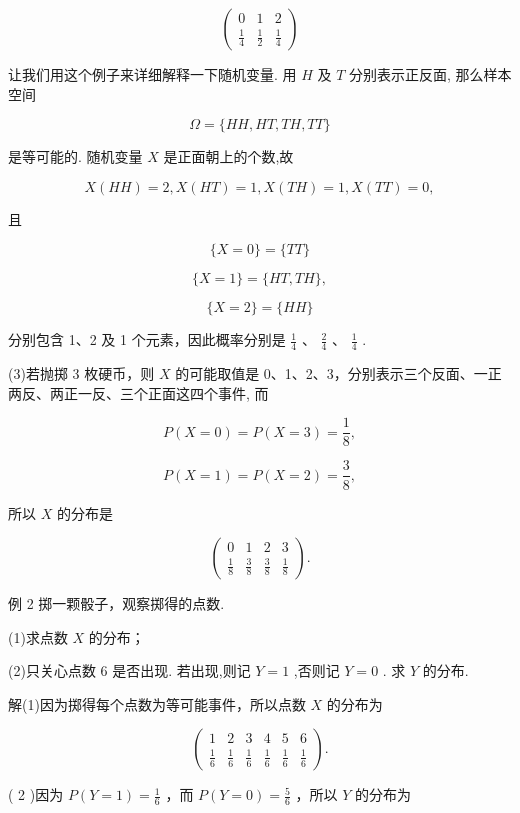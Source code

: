 \documentclass[10pt]{article}
\begin{document}
\[
\left( \begin{matrix} 0 & 1 & 2 \\  \frac{1}{4} & \frac{1}{2} & \frac{1}{4} \end{matrix}\right)
\]

让我们用这个例子来详细解释一下随机变量. 用 \(H\) 及 \(T\) 分别表示正反面, 那么样本空间

\[
\Omega  = \{ {HH},{HT},{TH},{TT}\}
\]

是等可能的. 随机变量 \(X\) 是正面朝上的个数,故

\[
X\left( {HH}\right)  = 2,X\left( {HT}\right)  = 1,X\left( {TH}\right)  = 1,X\left( {TT}\right)  = 0,
\]

且

\[
\{ X = 0\}  = \{ {TT}\}
\]

\[
\{ X = 1\}  = \{ {HT},{TH}\} ,
\]

\[
\{ X = 2\}  = \{ {HH}\}
\]

分别包含 1、2 及 1 个元素，因此概率分别是 \(\frac{1}{4}\) 、 \(\frac{2}{4}\) 、 \(\frac{1}{4}\) .

(3)若抛掷 3 枚硬币，则 \(X\) 的可能取值是 0、1、2、3，分别表示三个反面、一正两反、两正一反、三个正面这四个事件, 而

\[
P\left( {X = 0}\right)  = P\left( {X = 3}\right)  = \frac{1}{8},
\]

\[
P\left( {X = 1}\right)  = P\left( {X = 2}\right)  = \frac{3}{8},
\]

所以 \(X\) 的分布是

\[
\left( \begin{array}{llll} 0 & 1 & 2 & 3 \\  \frac{1}{8} & \frac{3}{8} & \frac{3}{8} & \frac{1}{8} \end{array}\right) .
\]

例 2 掷一颗骰子，观察掷得的点数.

(1)求点数 \(X\) 的分布；

(2)只关心点数 6 是否出现. 若出现,则记 \(Y = 1\) ,否则记 \(Y = 0\) . 求 \(Y\) 的分布.

解(1)因为掷得每个点数为等可能事件，所以点数 \(X\) 的分布为

\[
\left( \begin{array}{llllll} 1 & 2 & 3 & 4 & 5 & 6 \\  \frac{1}{6} & \frac{1}{6} & \frac{1}{6} & \frac{1}{6} & \frac{1}{6} & \frac{1}{6} \end{array}\right) .
\]

( 2 )因为 \(P\left( {Y = 1}\right)  = \frac{1}{6}\) ，而 \(P\left( {Y = 0}\right)  = \frac{5}{6}\) ，所以 \(Y\) 的分布为
\end{document}
